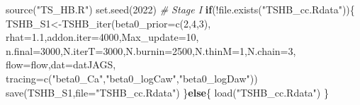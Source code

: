 \documentclass[
]{article}
\newenvironment{Shaded}{\begin{snugshade}}{\end{snugshade}}
\newcommand{\AttributeTok}[1]{\textcolor[rgb]{0.77,0.63,0.00}{#1}}
\newcommand{\CommentTok}[1]{\textcolor[rgb]{0.56,0.35,0.01}{\textit{#1}}}
\newcommand{\ControlFlowTok}[1]{\textcolor[rgb]{0.13,0.29,0.53}{\textbf{#1}}}
\newcommand{\DecValTok}[1]{\textcolor[rgb]{0.00,0.00,0.81}{#1}}
\newcommand{\FloatTok}[1]{\textcolor[rgb]{0.00,0.00,0.81}{#1}}
\newcommand{\FunctionTok}[1]{\textcolor[rgb]{0.00,0.00,0.00}{#1}}
\newcommand{\NormalTok}[1]{#1}
\newcommand{\OtherTok}[1]{\textcolor[rgb]{0.56,0.35,0.01}{#1}}
\newcommand{\SpecialCharTok}[1]{\textcolor[rgb]{0.00,0.00,0.00}{#1}}
\newcommand{\StringTok}[1]{\textcolor[rgb]{0.31,0.60,0.02}{#1}}
\begin{document}
\begin{Shaded}
\begin{Highlighting}[]
\FunctionTok{source}\NormalTok{(}\StringTok{"TS\_HB.R"}\NormalTok{)}
\FunctionTok{set.seed}\NormalTok{(}\DecValTok{2022}\NormalTok{)}
\CommentTok{\# Stage I}
\ControlFlowTok{if}\NormalTok{(}\SpecialCharTok{!}\FunctionTok{file.exists}\NormalTok{(}\StringTok{"TSHB\_cc.Rdata"}\NormalTok{))\{}
\NormalTok{    TSHB\_S1}\OtherTok{\textless{}{-}}\FunctionTok{TSHB\_iter}\NormalTok{(}\AttributeTok{beta0\_prior=}\FunctionTok{c}\NormalTok{(}\DecValTok{2}\NormalTok{,}\DecValTok{4}\NormalTok{,}\DecValTok{3}\NormalTok{),}
                   \AttributeTok{rhat=}\FloatTok{1.1}\NormalTok{,}\AttributeTok{addon.iter=}\DecValTok{4000}\NormalTok{,}\AttributeTok{Max\_update=}\DecValTok{10}\NormalTok{,}
                   \AttributeTok{n.final=}\DecValTok{3000}\NormalTok{,}\AttributeTok{N.iterT=}\DecValTok{3000}\NormalTok{,}\AttributeTok{N.burnin=}\DecValTok{2500}\NormalTok{,}\AttributeTok{N.thinM=}\DecValTok{1}\NormalTok{,}\AttributeTok{N.chain=}\DecValTok{3}\NormalTok{,}
                   \AttributeTok{flow=}\NormalTok{flow,}\AttributeTok{dat=}\NormalTok{datJAGS,}
                   \AttributeTok{tracing=}\FunctionTok{c}\NormalTok{(}\StringTok{"beta0\_Ca"}\NormalTok{,}\StringTok{"beta0\_logCaw"}\NormalTok{,}\StringTok{"beta0\_logDaw"}\NormalTok{))}
    \FunctionTok{save}\NormalTok{(TSHB\_S1,}\AttributeTok{file=}\StringTok{"TSHB\_cc.Rdata"}\NormalTok{)}
\NormalTok{\}}\ControlFlowTok{else}\NormalTok{\{}
    \FunctionTok{load}\NormalTok{(}\StringTok{"TSHB\_cc.Rdata"}\NormalTok{)}
\NormalTok{\}}


\end{Highlighting}
\end{Shaded}
\end{document}
